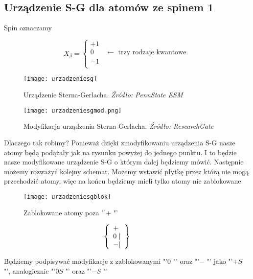 \subsection{Urządzenie S-G dla atomów ze spinem 1}
\begin{minipage}{0.2 \textwidth}
	\vspace{11pt}
	Spin oznaczamy
\end{minipage}
\begin{minipage}{0.11 \textwidth}
    \begingroup
    \hfuzz=1000pt
	\begin{equation*}
		X_{\beta} = 
		\begin{cases}
			+1 \\
			0 \hspace{20pt} \leftarrow \text{ trzy rodzaje kwantowe.} \\
			-1 \\
		\end{cases}
	\end{equation*}
    \endgroup
\end{minipage}
\begin{figure}[H]
	\centering
	\texttt{[image: urzadzeniesg]}
	\caption{Urządzenie Sterna-Gerlacha. \textit{Źródło: PennState ESM}}
	\label{fig:urzSG}
\end{figure}
\begin{figure}[H]
	\centering
	\texttt{[image: urzadzeniesgmod.png]}
	\caption{Modyfikacja urządzenia Sterna-Gerlacha. \textit{Źródło: ResearchGate}}
	\label{fig:urzSGmod}
\end{figure}
Dlaczego tak robimy? Ponieważ dzięki zmodyfikowaniu urządzenia S-G nasze atomy będą podążały jak na rysunku powyżej do jednego punktu. I to będzie nasze modyfikowane urządzenie S-G o którym dalej będziemy mówić. Następnie możemy rozważyć kolejny schemat. Możemy wstawić płytkę przez którą nie mogą przechodzić atomy, więc na końcu będziemy mieli tylko atomy nie zablokowane.

\begin{minipage}{0.5 \textwidth}
	\begin{figure}[H]
		\centering
		\texttt{[image: urzadzeniesgblok]}
		\caption{Zablokowane atomy poza  "'$+$ "'}
		\label{fig:urzSGblok}
	\end{figure}
\end{minipage}
\begin{minipage}{0.05 \textwidth}
	\vspace{-20pt}
	\begin{equation*}
		\hspace{-30pt}
		\left\{\begin{array}{lr}
			+ \\
			0 \hspace{3pt} \vert \\
			- \vert
		\end{array}\right\}
	\end{equation*}
\end{minipage}
\begin{minipage}{0.45 \textwidth}
	Będziemy podpisywać modyfikacje z zablokowanymi  "'$0$ "' oraz  "'$-$ "' jako  "'$+S$ "', analogicznie  "'$0S$ "' oraz  "'$-S$ "'
\end{minipage}


